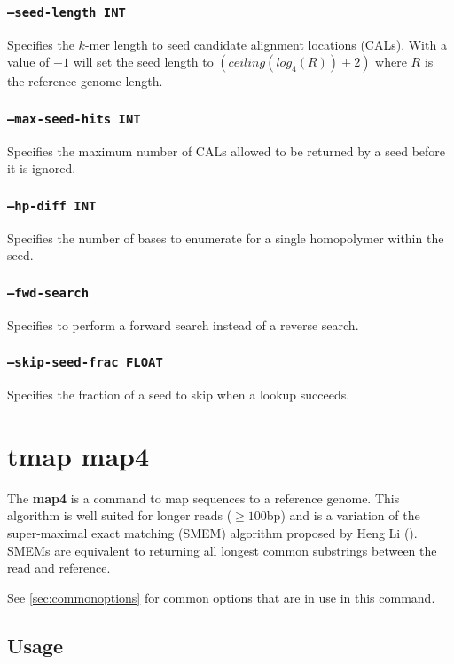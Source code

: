 \documentclass[a4paper,12pt]{book}
\newcommand{\TT}[1]{{\tt #1}} %
\newcommand{\BF}[1]{{\bf #1}} %
\begin{document}
\subsubsection{\TT{--seed-length INT}}
Specifies the $k$-mer length to seed candidate alignment locations (CALs).
With a value of $-1$ will set the seed length to $\left(ceiling(log_4(R)) + 2\right)$ where $R$ is the reference genome length.

\subsubsection{\TT{--max-seed-hits INT}}
Specifies the maximum number of CALs allowed to be returned by a seed before it is ignored.

\subsubsection{\TT{--hp-diff INT}}
Specifies the number of bases to enumerate for a single homopolymer within the seed.

\subsubsection{\TT{--fwd-search}}
Specifies to perform a forward search instead of a reverse search.

\subsubsection{\TT{--skip-seed-frac FLOAT}}
Specifies the fraction of a seed to skip when a lookup succeeds.

\section{tmap map4}
\label{sec:map4}
The \BF{map4} is a command to map sequences to a reference genome.
This algorithm is well suited for longer reads ($\geq 100$bp) and is a variation of the super-maximal exact matching (SMEM) algorithm proposed by Heng Li (\cite{Fastmap}).
SMEMs are equivalent to returning all longest common substrings between the read and reference.

See \autoref{sec:commonoptions} for common options that are in use in this command.

\subsection{Usage}
\end{document}
